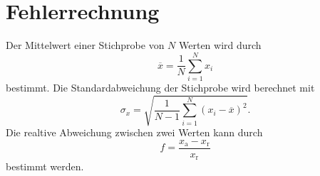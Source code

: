 \section{Fehlerrechnung}

Der Mittelwert einer Stichprobe von $N$ Werten wird durch
\begin{equation}
    \overline{x} = \frac{1}{N} \sum_{i=1}^N x_i
    \label{eqn:mittelwert}
\end{equation}
bestimmt.
\newline
Die Standardabweichung der Stichprobe wird berechnet mit
\begin{equation*}
    \sigma_x = \sqrt{\frac{1}{N-1} \sum_{i=1}^N (x_i - \overline{x})^2}.
    \label{eqn:standard}
\end{equation*}
\newline
Die realtive Abweichung zwischen zwei Werten kann durch
\begin{equation*}
    f = \frac{x_\text{a} - x_\text{r}}{x_\text{r}}
\end{equation*}
bestimmt werden.